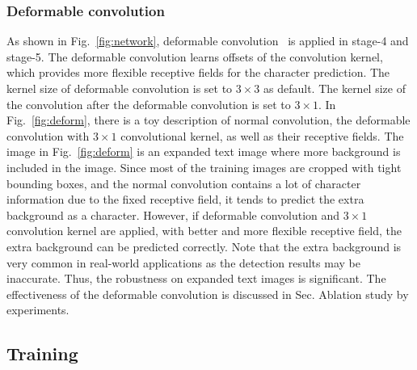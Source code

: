 \documentclass[letterpaper]{article} \usepackage{aaai19}  \usepackage{times}  \usepackage{helvet}  \usepackage{courier}  \usepackage{url}  \usepackage{graphicx}  \frenchspacing  \usepackage{multirow}
\begin{document}
\subsubsection{Deformable convolution}
As shown in Fig.~\ref{fig:network}, deformable convolution~\cite{deform} is applied in stage-4 and stage-5. The deformable convolution learns offsets of the convolution kernel, which provides more flexible receptive fields for the character prediction. The kernel size of deformable convolution is set to $3 \times 3$ as default. The kernel size of the convolution after the deformable convolution is set to $3 \times 1$. In Fig.~\ref{fig:deform}, there is a toy description of normal convolution, the deformable convolution with $3 \times 1$ convolutional kernel, as well as their receptive fields. The image in Fig.~\ref{fig:deform} is an expanded text image where more background is included in the image. Since most of the training images are cropped with tight bounding boxes, and the normal convolution contains a lot of character information due to the fixed receptive field, it tends to predict the extra background as a character. However, if deformable convolution and $3 \times 1$ convolution kernel are applied, with better and more flexible receptive field, the extra background can be predicted correctly. Note that the extra background is very common in real-world applications as the detection results may be inaccurate. Thus, the robustness on expanded text images is significant. The effectiveness of the deformable convolution is discussed in Sec. Ablation study by experiments.

\subsection{Training}
\end{document}
